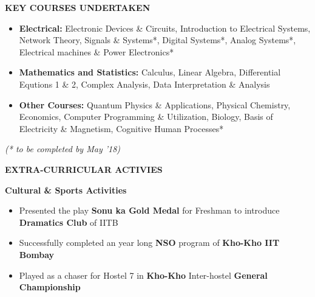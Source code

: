 \documentclass[11pt]{article}%
\begin{document}
\vspace{-0.2cm}

\begin{flushleft}
\bf{\LARGE{K}\Large{EY} \LARGE{C}\Large{OURSES} \LARGE{U}\Large{NDERTAKEN}}
\end{flushleft}
\vspace{-2mm}
\hline

\vspace{-0.2cm}
\begin{itemize}
\setlength\itemsep{0.01em}
\item \textbf{Electrical:} \nohyphens{Electronic Devices \& Circuits, Introduction to Electrical Systems, Network Theory, Signals \& Systems*, Digital Systems*, Analog Systems*, Electrical machines \& Power Electronics*}

\item \textbf{Mathematics and Statistics:} \nohyphens{Calculus, Linear Algebra, Differential Equtions 1 \& 2, Complex Analysis, Data Interpretation \& Analysis}
\item \textbf{Other Courses:} \nohyphens{Quantum Physics \& Applications, Physical Chemistry, Economics, Computer Programming \& Utilization, Biology, Basis of Electricity \& Magnetism, Cognitive Human Processes*}
\end{itemize}
\vspace{-4mm}
\hfill {{{\em{(* to be completed by May '18)}}}}








\vspace{-0.6cm}
\begin{flushleft}
\bf{\LARGE{E}\Large{XTRA-}\LARGE{C}\Large{URRICULAR} \LARGE{A}\Large{CTIVIES}}
\end{flushleft}
\vspace{-2mm}
\hline
\vspace{-0.2cm}
{\flushleft \bf \large{Cultural \& Sports Activities}}
\begin{itemize}
    \setlength\itemsep{0.01em}
    \vspace{-0.2cm}
    \item Presented the play \textbf{Sonu ka Gold Medal} for Freshman to introduce \textbf{Dramatics Club} of IITB
    \item \nohyphens{Successfully completed an year long \textbf{NSO} program of \textbf{Kho-Kho IIT Bombay}}
    \item Played as a chaser for Hostel 7 in \textbf{Kho-Kho} Inter-hostel \textbf{General Championship}

    
\end{itemize}
\end{document}

